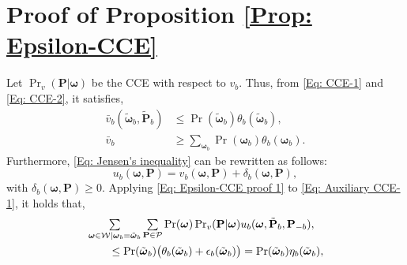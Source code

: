 \documentclass[conference]{IEEEtran}
\begin{document}
\section{Proof of Proposition \ref{Prop: Epsilon-CCE}}
\label{Lem: Epsilon-CCE}
Let $\Pr_v(\mathbf{P}|  \boldsymbol{\omega})$ be the CCE with respect to $v_{b}$. Thus, from \eqref{Eq: CCE-1} and \eqref{Eq: CCE-2}, it satisfies,
%
%
\begin{align}
%
%
\bar{v}_{b}(\tilde{\boldsymbol{\omega}}_b,\tilde{\mathbf{P}}_{b}) &\leq \Pr(\tilde{\boldsymbol{\omega}}_b)\theta_b( \tilde{\boldsymbol{\omega}}_b), \label{Eq: Auxiliary CCE-1} \\
%
 \bar{v}_{b} &\geq \textstyle\sum_{\boldsymbol{\omega}_b} \Pr(\boldsymbol{\omega}_b)\theta_b( \boldsymbol{\omega}_b).\label{Eq: Auxiliary CCE-2}
%
%
\end{align}
%
%
%
Furthermore,  \eqref{Eq: Jensen's inequality} can be rewritten as follows:
%
%
%
\begin{equation}\label{Eq: Epsilon-CCE proof 1}
u_{b}(\boldsymbol{\omega},\mathbf{P})= v_{b}(\boldsymbol{\omega},\mathbf{P})+ \delta_{b}(\boldsymbol{\omega},\mathbf{P}),
\end{equation}
%
%
%
with $\delta_{b}(\boldsymbol{\omega},\mathbf{P})\geq 0$.
Applying \eqref{Eq: Epsilon-CCE proof 1} to \eqref{Eq: Auxiliary CCE-1}, it holds that,
%
%
%
\begin{align}
&\textstyle \sum\limits_{\boldsymbol{\omega}\in\mathcal{W}|\boldsymbol{\omega}_b=\tilde{\boldsymbol{\omega}}_{b}}
 \sum\limits_{\mathbf{P}\in\mathcal{P}}  \Pr(\boldsymbol{\omega})\Pr_v(\mathbf{P}|  \boldsymbol{\omega})u_{b}(\boldsymbol{\omega},\tilde{\mathbf{P}}_{b},\mathbf{P}_{-b}),\notag
%
%
%
\\&\qquad \leq\Pr(\tilde{\boldsymbol{\omega}}_b)\big(\theta_b( \tilde{\boldsymbol{\omega}}_b)+\epsilon_b( \tilde{\boldsymbol{\omega}}_b)\big)=\Pr(\tilde{\boldsymbol{\omega}}_b)\eta_b( \tilde{\boldsymbol{\omega}}_b),\label{Eq: Epsilon-CCE proof 2}
%
\end{align}
\end{document}
